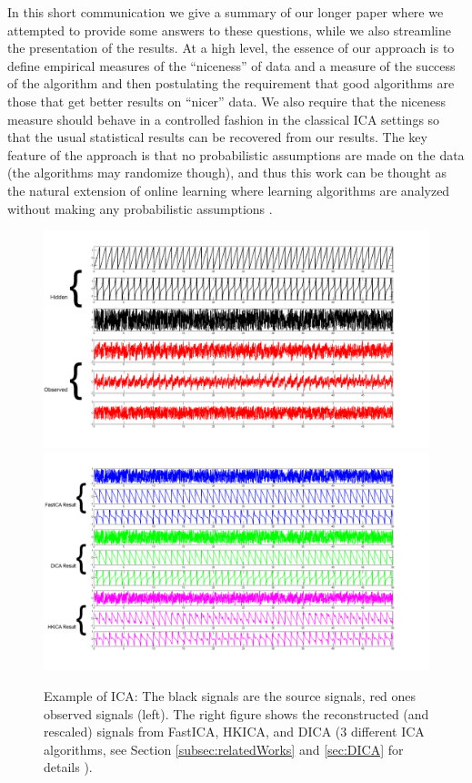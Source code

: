 \documentclass{article} %
\theoremstyle{definition}
\begin{document}
In this short communication we give a summary of our longer paper \citep{HuGySze15} where we attempted to provide some answers to these questions, while we also streamline the presentation of the results. 
At a high level, the essence of our approach is to define empirical measures of the ``niceness'' of data 
and a measure of the success of the algorithm and then postulating the requirement that good algorithms are those that get better results on ``nicer'' data. We also require that the niceness measure should behave in a controlled fashion in the classical
ICA settings so that the usual statistical results can be recovered from our results.
The key feature of the approach is that no probabilistic assumptions are made on the data (the algorithms may randomize though), and thus this work can be thought as the natural extension of online learning
where learning algorithms are analyzed without making any probabilistic assumptions \citep{CBLu06:book}.
\begin{figure}[t]
\centering
	\includegraphics[width = 0.49\linewidth]{demo_source}
	\includegraphics[width = 0.49\linewidth]{demo_res}
\caption{Example of ICA: The black signals are the source signals, red ones observed signals (left). The right figure shows the reconstructed (and rescaled) signals from FastICA, HKICA, and DICA (3 different ICA algorithms, see Section \ref{subsec:relatedWorks} and \ref{sec:DICA} for details ).}
\label{fig:demo}
\end{figure}
\end{document}
